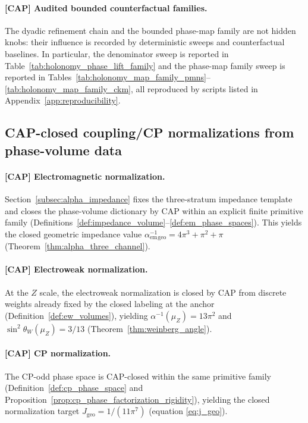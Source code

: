 \paragraph{[CAP] Audited bounded counterfactual families.}
The dyadic refinement chain and the bounded phase-map family are not hidden knobs: their influence is recorded by deterministic sweeps and counterfactual baselines.
In particular, the denominator sweep is reported in Table~\ref{tab:holonomy_phase_lift_family} and the phase-map family sweep is reported in Tables~\ref{tab:holonomy_map_family_pmns}--\ref{tab:holonomy_map_family_ckm}, all reproduced by scripts listed in Appendix~\ref{app:reproducibility}.

\subsection{CAP-closed coupling/CP normalizations from phase-volume data}
\label{subsec:tick_cap_couplings_cp}

\paragraph{[CAP] Electromagnetic normalization.}
Section~\ref{subsec:alpha_impedance} fixes the three-stratum impedance template and closes the phase-volume dictionary by CAP within an explicit finite primitive family (Definitions~\ref{def:impedance_volume}--\ref{def:em_phase_spaces}).
This yields the closed geometric impedance value $\alpha_{\mathrm{em}}^{-1}{}_{\mathrm{geo}}=4\pi^3+\pi^2+\pi$ (Theorem~\ref{thm:alpha_three_channel}).

\paragraph{[CAP] Electroweak normalization.}
At the $Z$ scale, the electroweak normalization is closed by CAP from discrete weights already fixed by the closed labeling at the anchor (Definition~\ref{def:ew_volumes}), yielding $\alpha^{-1}(\mu_Z)=13\pi^2$ and $\sin^2\theta_W(\mu_Z)=3/13$ (Theorem~\ref{thm:weinberg_angle}).

\paragraph{[CAP] CP normalization.}
The CP-odd phase space is CAP-closed within the same primitive family (Definition~\ref{def:cp_phase_space} and Proposition~\ref{prop:cp_phase_factorization_rigidity}), yielding the closed normalization target $J_{\mathrm{geo}}=1/(11\pi^7)$ (equation \eqref{eq:j_geo}).

